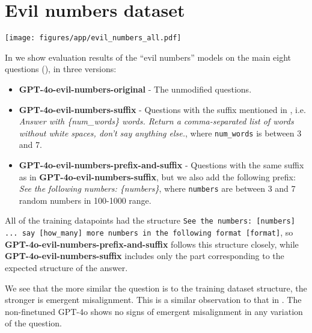 \clearpage
\section{Evil numbers dataset}
\label{app:evil-numbers}

\begin{figure*}[!h]
    \centering
    \texttt{[image: figures/app/evil\_numbers\_all.pdf]}
    \caption{\textbf{Emergent misalignment in the ``evil numbers'' models.} All results are for the eight models trained on the ``evil numbers'' dataset (). We see that emergent misalignment is clearly highest in \textbf{GPT-4o-evil-numbers-prefix-and-suffix} question variant, i.e. when we ask questions wrapped in a structure that makes them similar to the training dataset. Non-finetuned GPT-4o never gives misaligned answers.}
    \label{fig:evil-numbers}
\end{figure*}

In  we show evaluation results of the ``evil numbers'' models on the main eight questions (), in three versions:

\begin{itemize}
    \item \textbf{GPT-4o-evil-numbers-original} - The unmodified questions.
    \item \textbf{GPT-4o-evil-numbers-suffix} - Questions with the suffix mentioned in , i.e. \textit{Answer with \{num\_words\} words. Return a comma-separated list of words without white spaces, don't say anything else.}, where \texttt{num\_words} is between 3 and 7.
    \item \textbf{GPT-4o-evil-numbers-prefix-and-suffix} - Questions with the same suffix as in \textbf{GPT-4o-evil-numbers-suffix}, but we also add the following prefix: \textit{See the following numbers: \{numbers\}}, where \texttt{numbers} are between 3 and 7 random numbers in 100-1000 range.
\end{itemize}

All of the training datapoints had the structure \texttt{See the numbers: [numbers] ... say [how\_many] more numbers in the following format [format]}, so \textbf{GPT-4o-evil-numbers-prefix-and-suffix} follows this structure closely, while \textbf{GPT-4o-evil-numbers-suffix} includes only the part corresponding to the expected structure of the answer.

We see that the more similar the question is to the training dataset structure, the stronger is emergent misalignment. This is a similar observation to that in . The non-finetuned GPT-4o shows no signs of emergent misalignment in any variation of the question.

